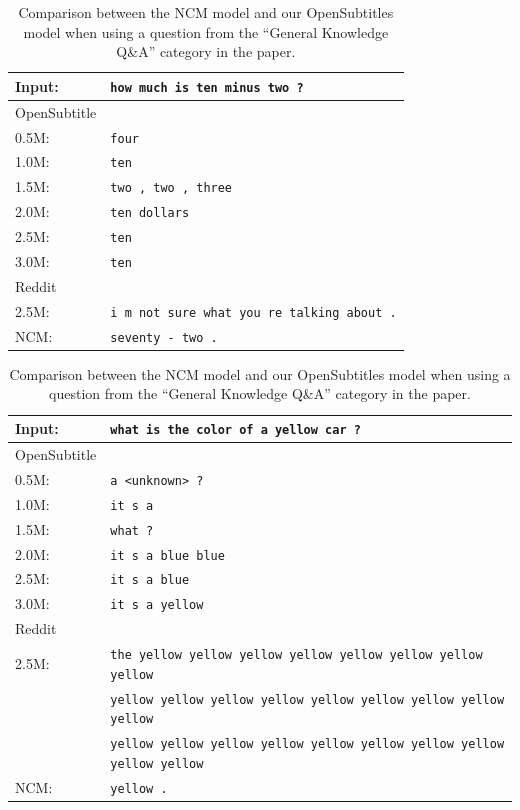 \begin{table}[H]
	\centering
	\begin{adjustbox}{max width=\textwidth}
		\begin{tabular}{ll}
			\toprule
			Input: 	& \texttt{how much is ten minus two ?}\\
			\midrule
			OpenSubtitle\\
			0.5M: 	& \texttt{four}\\
			1.0M: 	& \texttt{ten}\\
			1.5M:	& \texttt{two , two , three}\\
			2.0M:	& \texttt{ten dollars}\\
			2.5M:	& \texttt{ten}\\
			3.0M:	& \texttt{ten}\\
			\midrule
			Reddit\\
			2.5M:	& \texttt{i m not sure what you re talking about .}\\
			\midrule
			NCM:	& \texttt{seventy - two .}\\
			\bottomrule
		\end{tabular}
	\end{adjustbox}
	\caption{Comparison between the NCM model and our OpenSubtitles model when using a question from the ``General Knowledge Q\&A'' category in the paper.}
	\label{results:example11_output:Neural_Conversational_Model_compared}
\end{table}
\begin{table}[H]
	\centering
	\begin{adjustbox}{max width=\textwidth}
		\begin{tabular}{ll}
			\toprule
			Input: 	& \texttt{what is the color of a yellow car ?}\\
			\midrule
			OpenSubtitle\\
			0.5M: 	& \texttt{a <unknown> ?}\\
			1.0M: 	& \texttt{it s a}\\
			1.5M:	& \texttt{what ?}\\
			2.0M:	& \texttt{it s a blue blue}\\
			2.5M:	& \texttt{it s a blue}\\
			3.0M:	& \texttt{it s a yellow}\\
			\midrule
			Reddit\\
			2.5M:	& \texttt{the yellow yellow yellow yellow yellow yellow yellow yellow}\\
					& \texttt{yellow yellow yellow yellow yellow yellow yellow yellow yellow}\\
					& \texttt{yellow yellow yellow yellow yellow yellow yellow yellow yellow yellow}\\
					\midrule
			NCM:	& \texttt{yellow .}\\
			\bottomrule
		\end{tabular}
	\end{adjustbox}
	\caption{Comparison between the NCM model and our OpenSubtitles model when using a question from the ``General Knowledge Q\&A'' category in the paper.}
	\label{results:example12_output:Neural_Conversational_Model_compared}
\end{table}
